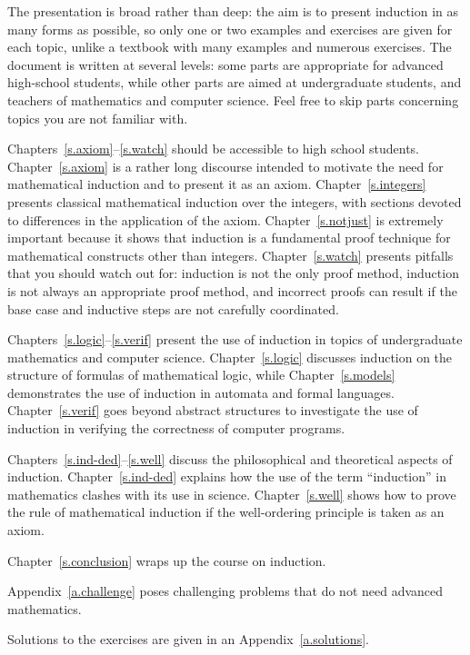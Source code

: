 \documentclass[11pt,a4paper]{report}
\begin{document}
The presentation is broad rather than deep: the aim is to present induction in as many forms as possible, so only one or two examples and exercises are given for each topic, unlike a textbook with many examples and numerous exercises. The document is written at several levels: some parts are appropriate for advanced high-school students, while other parts are aimed at undergraduate students, and teachers of mathematics and computer science. Feel free to skip parts concerning topics you are not familiar with. 

Chapters~\ref{s.axiom}--\ref{s.watch} should be accessible to high school students. Chapter~\ref{s.axiom} is a rather long discourse intended to motivate the need for mathematical induction and to present it as an axiom. Chapter~\ref{s.integers} presents classical mathematical induction over the integers, with sections devoted to differences in the application of the axiom. Chapter~\ref{s.notjust} is extremely important because it shows that induction is a fundamental proof technique for mathematical constructs other than integers. Chapter~\ref{s.watch} presents pitfalls that you should watch out for: induction is not the only proof method, induction is not always an appropriate proof method, and incorrect proofs can result if the base case and inductive steps are not carefully coordinated.

Chapters~\ref{s.logic}--\ref{s.verif} present the use of induction in topics of undergraduate mathematics and computer science. Chapter~\ref{s.logic} discusses induction on the structure of formulas of mathematical logic, while Chapter~\ref{s.models} demonstrates the use of induction in automata and formal languages. Chapter~\ref{s.verif} goes beyond abstract structures to investigate the use of induction in verifying the correctness of computer programs.

Chapters~\ref{s.ind-ded}--\ref{s.well} discuss the philosophical and theoretical aspects of induction. Chapter~\ref{s.ind-ded} explains how the use of the term ``induction'' in mathematics clashes with its use in science. Chapter~\ref{s.well} shows how to prove the rule of mathematical induction if the well-ordering principle is taken as an axiom.

Chapter~\ref{s.conclusion} wraps up the course on induction.

Appendix~\ref{a.challenge} poses challenging problems that do not need advanced mathematics.

Solutions to the exercises are given in an Appendix~\ref{a.solutions}.
\end{document}
